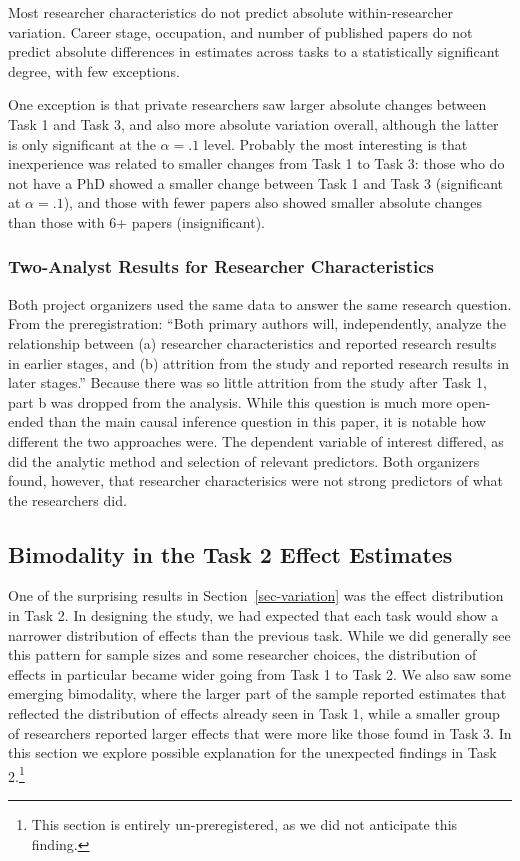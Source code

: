 \documentclass[
  letterpaper,
  DIV=11,
  numbers=noendperiod]{scrartcl}
\begin{document}
Most researcher characteristics do not predict absolute
within-researcher variation. Career stage, occupation, and number of
published papers do not predict absolute differences in estimates across
tasks to a statistically significant degree, with few exceptions.

One exception is that private researchers saw larger absolute changes
between Task 1 and Task 3, and also more absolute variation overall,
although the latter is only significant at the \(\alpha = .1\) level.
Probably the most interesting is that inexperience was related to
smaller changes from Task 1 to Task 3: those who do not have a PhD
showed a smaller change between Task 1 and Task 3 (significant at
\(\alpha = .1\)), and those with fewer papers also showed smaller
absolute changes than those with 6+ papers (insignificant).

\hypertarget{two-analyst-results-for-researcher-characteristics}{%
\subsubsection{Two-Analyst Results for Researcher
Characteristics}\label{two-analyst-results-for-researcher-characteristics}}

Both project organizers used the same data to answer the same research
question. From the preregistration: ``Both primary authors will,
independently, analyze the relationship between (a) researcher
characteristics and reported research results in earlier stages, and (b)
attrition from the study and reported research results in later
stages.'' Because there was so little attrition from the study after
Task 1, part b was dropped from the analysis. While this question is
much more open-ended than the main causal inference question in this
paper, it is notable how different the two approaches were. The
dependent variable of interest differed, as did the analytic method and
selection of relevant predictors. Both organizers found, however, that
researcher characterisics were not strong predictors of what the
researchers did.

\hypertarget{sec-bimodal}{%
\subsection{Bimodality in the Task 2 Effect
Estimates}\label{sec-bimodal}}

One of the surprising results in Section~\ref{sec-variation} was the
effect distribution in Task 2. In designing the study, we had expected
that each task would show a narrower distribution of effects than the
previous task. While we did generally see this pattern for sample sizes
and some researcher choices, the distribution of effects in particular
became wider going from Task 1 to Task 2. We also saw some emerging
bimodality, where the larger part of the sample reported estimates that
reflected the distribution of effects already seen in Task 1, while a
smaller group of researchers reported larger effects that were more like
those found in Task 3. In this section we explore possible explanation
for the unexpected findings in Task 2.\footnote{This section is entirely
  un-preregistered, as we did not anticipate this finding.}
\end{document}
